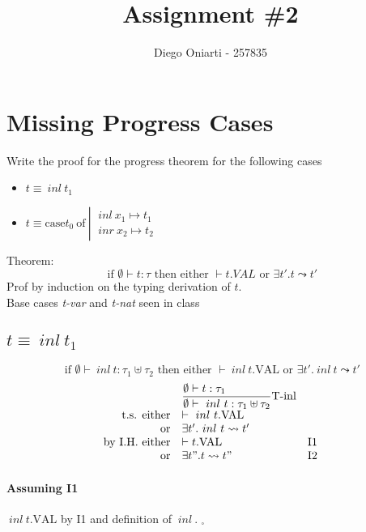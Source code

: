 \documentclass{article}
\title{Assignment \#2}
\author{Diego Oniarti - 257835}
\date{}
\newcommand{\st}[3][]{\ensuremath{\displaystyle\frac{#3\hfill}{#2\hfill} \text{#1}}}
\newcommand{\inl}[0]{\ensuremath{\ inl\ }}
\newcommand{\inr}[0]{\ensuremath{\ inr\ }}
\newcommand{\case}[3]{\ensuremath{\text{case}#1\ \text{of}\ \left|\begin{aligned}#2\\#3\end{aligned}\right.}}
\begin{document}
\maketitle

\section{Missing Progress Cases}
Write the proof for the progress theorem for the following cases
\begin{itemize}
    \item $t \equiv \inl t_1$
    \item $t \equiv \case{t_0}{\inl x_1 \mapsto t_1}{\inr x_2 \mapsto t_2}$
\end{itemize}

Theorem:
\[
    \text{ if } \emptyset \vdash t:\tau \text{ then either } \vdash t.VAL \text{ or } \exists t'.t\leadsto t'
\] 
Prof by induction on the typing derivation of $t$.\\
Base cases \textit{t-var} and \textit{t-nat} seen in class

\subsection{$t \equiv \inl t_1$}
\[
    \text{ if } \emptyset \vdash \inl t:\tau_1\uplus\tau_2 \text{ then either } \vdash \inl t.\text{VAL} \text{ or } \exists t'.\inl t\leadsto t'
\] 
\[
    \begin{array}{rl @{\quad} l}
                             &  \st[T-inl]{\emptyset\vdash \inl t: \tau_1\uplus\tau_2}{\emptyset\vdash t:\tau_1}  \\
        \text{t.s. either}   &   \vdash \inl t.\text{VAL} \\
        \text{or}            &   \exists t'.\inl t \leadsto t' \\
        \text{by I.H. either}&   \vdash t.\text{VAL}                 & \text{I1} \\
        \text{or}            &   \exists t".t \leadsto t"            & \text{I2} \\
    \end{array}
\]

\paragraph{Assuming I1}
$\inl t.\text{VAL}$ by I1 and definition of $\inl$. $_\square$
\end{document}
